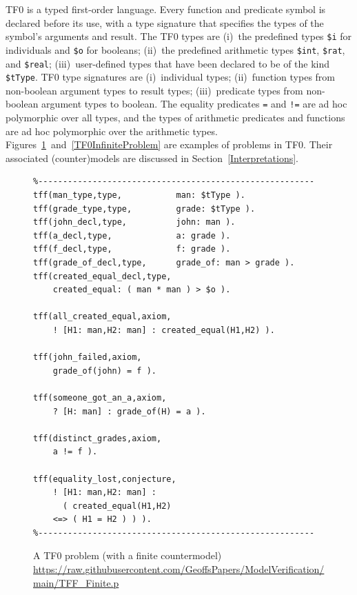 \documentclass[letterpaper]{article}
\newcommand{\smalltt}[1]{\small \texttt{#1}}
\begin{document}
TF0 is a typed first-order language.
Every function and predicate symbol is declared before its use, with a type signature that 
specifies the types of the symbol’s arguments and result.
The TF0 types are
(i)~the predefined types \smalltt{\$i} for individuals and \smalltt{\$o} for booleans; 
(ii)~the predefined arithmetic types \smalltt{\$int}, \smalltt{\$rat}, and \smalltt{\$real}; 
(iii)~user-defined types that have been declared to be of the kind \smalltt{\$tType}.
TF0 type signatures are 
(i)~individual types;
(ii)~function types from non-boolean argument types to result types;
(iii)~predicate types from non-boolean argument types to boolean.
The equality predicates {\tt =} and {\tt !=} are ad hoc polymorphic over all types, and the types 
of arithmetic predicates and functions are ad hoc polymorphic over the arithmetic types.
Figures~\ref{TF0FiniteProblem}~and~\ref{TF0InfiniteProblem} are examples of problems in TF0.  Their associated (counter)models are discussed in Section~\ref{Interpretations}.

\begin{figure}[htbp]
\scriptsize
{}
\begin{verbatim}
%--------------------------------------------------------
tff(man_type,type,           man: $tType ).
tff(grade_type,type,         grade: $tType ).
tff(john_decl,type,          john: man ).
tff(a_decl,type,             a: grade ).
tff(f_decl,type,             f: grade ).
tff(grade_of_decl,type,      grade_of: man > grade ).
tff(created_equal_decl,type, 
    created_equal: ( man * man ) > $o ).

tff(all_created_equal,axiom,
    ! [H1: man,H2: man] : created_equal(H1,H2) ).

tff(john_failed,axiom,
    grade_of(john) = f ).

tff(someone_got_an_a,axiom,
    ? [H: man] : grade_of(H) = a ).

tff(distinct_grades,axiom,
    a != f ).

tff(equality_lost,conjecture,
    ! [H1: man,H2: man] :
      ( created_equal(H1,H2)
    <=> ( H1 = H2 ) ) ).
%--------------------------------------------------------
\end{verbatim}
\caption{A TF0 problem (with a finite countermodel)\\
{\scriptsize \url{https://raw.githubusercontent.com/GeoffsPapers/ModelVerification/main/TFF_Finite.p}}}
\label{TF0FiniteProblem}
\end{figure}
\end{document}
